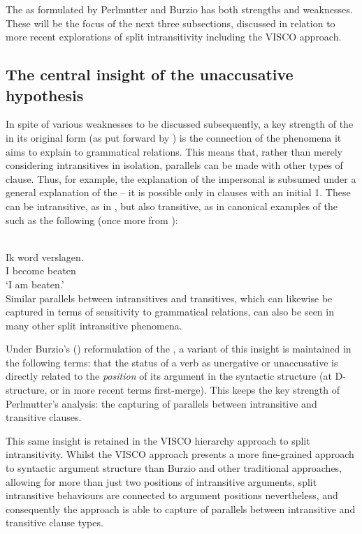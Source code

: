 \documentclass[output=paper]{langsci/langscibook}
\begin{document}
\noindent The  as formulated by Perlmutter and
Burzio has both strengths and weaknesses. These will be the focus of the next
three subsections, discussed in relation to more recent explorations of split
intransitivity including the VISCO approach.

\subsection{The central insight of the unaccusative hypothesis}\label{sec:baker:3.3}\largerpage[-1]

In spite of various weaknesses to be discussed subsequently, a key strength of
the  in its original form (as put forward by
\citealt{Perlmutter1978}) is the connection of the phenomena it aims to explain
to grammatical relations. This means that, rather than merely considering
intransitives in isolation, parallels can be made with other types of clause.
Thus, for example, the explanation of the impersonal  is subsumed under
a general explanation of the  – it is possible only in clauses with an
initial 1. These can be intransitive, as in , but also transitive, as in
canonical examples of the  such as the following (once more from ):

\ea {}\label{ex:19:22}\\
    \gll Ik   word   verslagen.\\
        I   become   beaten\\
    \glt \enquote*{I am beaten.}\\
\z
Similar parallels between intransitives and transitives, which can likewise be
captured in terms of sensitivity to grammatical relations, can also be seen in
many other split intransitive phenomena.

Under Burzio’s (\citeyear{Burzio1981,Burzio1986}) reformulation of the
, a variant of this insight is maintained in the
following terms: that the status of a verb as unergative or
unaccusative is directly related to the \emph{position} of
its argument in the syntactic structure (at D-structure, or in more recent
terms first-merge). This keeps the key strength of Perlmutter’s analysis: the
capturing of parallels between intransitive and transitive clauses.

This same insight is retained in the VISCO hierarchy approach to split
intransitivity. Whilst the VISCO approach presents a more fine-grained approach
to syntactic argument structure than Burzio and other traditional approaches,
allowing for more than just two positions of intransitive arguments, split
intransitive behaviours are connected to argument positions nevertheless, and
consequently the approach is able to capture of parallels between intransitive
and transitive clause types.
\end{document}
